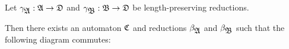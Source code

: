 \bigskip
\begin{lemma}
Let $\gamma_{\mbox{$\mathfrak{A}$}} : \mbox{$\mathfrak{A}$} \to \mbox{$\mathfrak{D}$}$ and $\gamma_{\mbox{$\mathfrak{B}$}} : \mbox{$\mathfrak{B}$} \to
\mbox{$\mathfrak{D}$}$ be length-preserving reductions.

Then there exists an automaton $\mbox{$\mathfrak{C}$}$ and reductions $\beta_{\mbox{$\mathfrak{A}$}}$ and
$\beta_{\mbox{$\mathfrak{B}$}}$ such that the following diagram commutes:
\begin{center}
\end{center}
\end{lemma}

